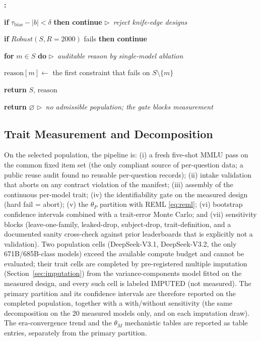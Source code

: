 \documentclass{ieeeaccess}
\theoremstyle{definition}
\theoremstyle{plain}
\newcounter{algstep}
\newenvironment{algsteps}{%
  \footnotesize
  \setcounter{algstep}{0}%
  \begin{list}{\textbf{\thealgstep:}}{%
    \usecounter{algstep}%
    \setlength{\labelwidth}{14pt}%
    \setlength{\labelsep}{4pt}%
    \setlength{\leftmargin}{20pt}%
    \setlength{\rightmargin}{0pt}%
    \setlength{\itemsep}{1pt}%
    \setlength{\parsep}{0pt}%
    \setlength{\topsep}{3pt}%
  }%
}{\end{list}}
\newcommand{\algind}[1]{\hspace*{#1.1em}}
\newcommand{\algkw}[1]{\textbf{#1}}
\newcommand{\algcomment}[1]{\textit{$\triangleright$~#1}}
\begin{document}
\begin{algorithm}[t]
\begin{algsteps}
\item \algind{1} \algkw{if} $\tau_{\mathrm{bias}} - |b| < \delta$
  \algkw{then continue} \algcomment{reject knife-edge designs}
\item \algind{1} \algkw{if} $\textit{Robust}(S, R{=}2000)$ fails
  \algkw{then continue}
\item \algind{1} \algkw{for} $m \in S$ \algkw{do} \algcomment{auditable reason
  by single-model ablation}
\item \algind{2} $\mathrm{reason}[m] \leftarrow$ the first constraint that
  fails on $S \setminus \{m\}$
\item \algind{1} \algkw{return} $S$, $\mathrm{reason}$
\item \algkw{return} $\varnothing$ \algcomment{no admissible population; the
  gate blocks measurement}
\end{algsteps}
\end{algorithm}

\subsection{Trait Measurement and Decomposition}
\label{sec:phase2}
On the selected population, the pipeline is: (i) a fresh five-shot MMLU pass
\cite{hendrycks2021} on the
common fixed item set (the only compliant source of per-question data; a public
reuse audit found no reusable per-question records); (ii) intake validation that
aborts on any contract violation of the manifest; (iii) assembly of the continuous
per-model trait; (iv) the identifiability gate on the measured design (hard fail =
abort); (v) the $\theta_{P}$ partition with REML \eqref{eq:reml}; (vi) bootstrap
confidence intervals combined with a trait-error Monte Carlo; and (vii) sensitivity
blocks (leave-one-family, leaked-drop, subject-drop, trait-definition, and a
documented sanity cross-check against prior leaderboards that is explicitly not a
validation). Two population cells (DeepSeek-V3.1, DeepSeek-V3.2, the only
671B/685B-class models) exceed the available compute budget and cannot be
evaluated; their trait cells are completed by pre-registered multiple imputation
(Section~\ref{sec:imputation}) from the variance-components model fitted on the
measured design, and every such cell is labeled IMPUTED (not measured). The
primary partition and its confidence intervals are therefore reported on the
completed population, together with a with/without sensitivity (the same
decomposition on the 20 measured models only, and on each imputation draw).
The era-convergence trend and the $\theta_{M}$ mechanistic tables are
reported as table entries, separately from the primary partition.
\end{document}
